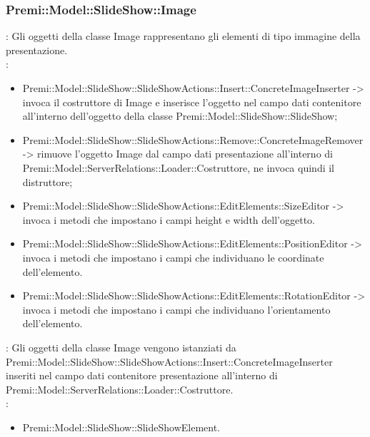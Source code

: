 {                    \subsubsection{Premi::Model::SlideShow::Image}{
				\textbf{\tipo}: Gli oggetti della classe Image rappresentano gli elementi di tipo immagine della presentazione.\\
				\textbf{\relaz}: 
				\begin{itemize}
					\item Premi::Model::SlideShow::SlideShowActions::Insert::ConcreteImageInserter -> invoca il costruttore di Image e inserisce l’oggetto nel campo dati contenitore all’interno dell’oggetto della classe Premi::Model::SlideShow::SlideShow;
                    \item Premi::Model::SlideShow::SlideShowActions::Remove::ConcreteImageRemover -> rimuove l’oggetto Image dal campo dati presentazione all’interno di Premi::Model::ServerRelations::Loader::Costruttore, ne invoca quindi il distruttore;
                    \item Premi::Model::SlideShow::SlideShowActions::EditElements::SizeEditor -> invoca i metodi che impostano i campi height e width dell'oggetto.
                    \item Premi::Model::SlideShow::SlideShowActions::EditElements::PositionEditor -> invoca i metodi che impostano i campi che individuano le coordinate dell'elemento.
                    \item Premi::Model::SlideShow::SlideShowActions::EditElements::RotationEditor -> invoca i metodi che impostano i campi che individuano l'orientamento dell'elemento.
				\end{itemize}	
                \textbf{\interfacce}: Gli oggetti della classe Image vengono istanziati da Premi::Model::SlideShow::SlideShowActions::Insert::ConcreteImageInserter  inseriti nel campo dati contenitore presentazione all’interno di Premi::Model::ServerRelations::Loader::Costruttore.\\
                \textbf{\base}: 
                    \begin{itemize}
                    \item Premi::Model::SlideShow::SlideShowElement.
                    \end{itemize}
                    }
}
